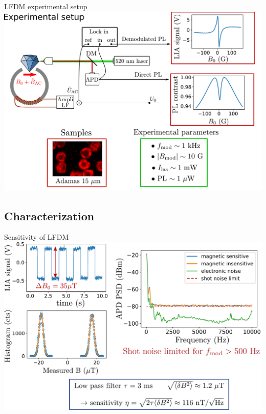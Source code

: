 \documentclass{beamer}
\begin{document}
\begin{frame}{LFDM experimental setup}
\centering
\includegraphics[width=\textwidth,height=0.85\textheight,keepaspectratio]{Slide_principle_LFDM}
\end{frame}

\subsection{Characterization}
\begin{frame}{Sensitivity of LFDM}
\centering
\includegraphics[width=\textwidth,height=0.85\textheight,keepaspectratio]{Slide_sensi_LFDM}
\end{frame}
\end{document}
